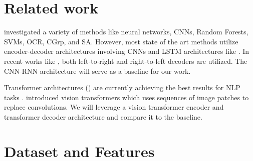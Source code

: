 \documentclass{article}
\begin{document}

\section{Related work}
\cite{schechter2017converting} investigated a variety of methods like neural networks, CNNs, Random Forests, SVMs, OCR, CGrp, and SA. However, most state of the art  methods utilize encoder-decoder architectures involving CNNs and LSTM architectures like \cite{genthial2016image}. In recent works like \cite{bian2022handwritten}, both left-to-right and right-to-left decoders are utilized. The CNN-RNN architecture will serve as a baseline for our work.

Transformer architectures (\cite{transformer}) are currently achieving the best results for NLP tasks . \cite{visiontransformer} introduced vision transformers which uses sequences of image patches to replace convolutions. We will leverage a vision transformer encoder and transformer decoder architecture and compare it to the baseline.

\section{Dataset and Features}
\end{document}
